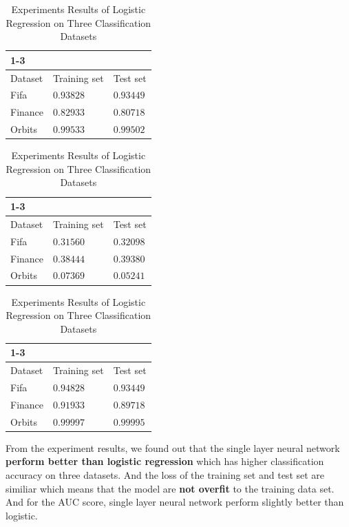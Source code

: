 \documentclass{article}
\begin{document}
\begin{table}[htb]
	\caption{Experiments Results of Logistic Regression on Three Classification Datasets}
	\label{sample-table}
	\centering
	
		\begin{tabular}{lll}
		\toprule
		\cmidrule{1-3}
		\multicolumn{3}{c}{Classification Accuracy}\\
		\midrule
		Dataset & Training set & Test set \\
		\midrule
		Fifa & $0.93828$ & $0.93449$  \\
		Finance & $0.82933$  & $0.80718$ \\
		Orbits & $0.99533$  & $0.99502$  \\
		\bottomrule
	\end{tabular}
	
		\begin{tabular}{lll}
		\toprule
		\cmidrule{1-3}
		\multicolumn{3}{c}{Loss}\\
		\midrule
		Dataset & Training set & Test set \\
		\midrule
		Fifa & $0.31560$ & $0.32098$  \\
		Finance & $0.38444$  & $0.39380$ \\
		Orbits & $0.07369$  & $0.05241$  \\
		\bottomrule
	\end{tabular}
	\hspace{5mm}
	\begin{tabular}{lll}
		\toprule
		\cmidrule{1-3}
		\multicolumn{3}{c}{AUC Score}\\
		\midrule
		Dataset & Training set & Test set \\
		\midrule
		Fifa & $0.94828$ & $0.93449$  \\
		Finance & $0.91933$  & $0.89718$ \\
		Orbits & $0.99997$  & $0.99995$  \\
		\bottomrule
	\end{tabular}
	

\end{table}

From the experiment results, we found out that the single layer neural network \textbf{perform better than logistic regression} which has higher classification accuracy on three datasets. And the loss of the training set and test set are similiar which means that the model are \textbf{not overfit} to the training data set. And for the AUC score, single layer neural network perform slightly better than logistic.
\end{document}

